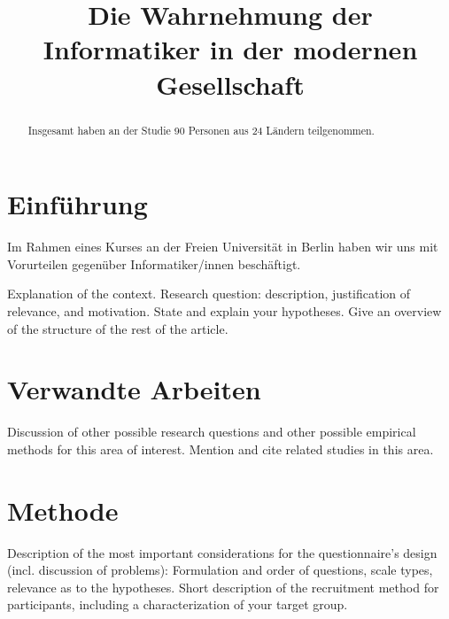 \documentclass[de]{agse-empir-report}\usepackage[]{graphicx}\usepackage[]{color}
\begin{document}
\title{Die Wahrnehmung der Informatiker in der modernen Gesellschaft}
\author{
    \and
    \and
}

\maketitle



\begin{abstract}
    \lipsum[1]
    Insgesamt haben an der Studie 90 Personen
    aus 24 Ländern teilgenommen.
\end{abstract}


\section[fz]{Einführung}

Im Rahmen eines Kurses an der Freien Universität in Berlin haben wir uns mit Vorurteilen gegenüber Informatiker/innen beschäftigt.


Explanation of the context.
Research question: description, justification of relevance,
and motivation.
State and explain your hypotheses.
Give an overview of the structure of the rest of the article.

\lipsum[2]


\section[kk]{Verwandte Arbeiten}

Discussion of other possible research questions and other possible
empirical methods for this area of interest.
Mention and cite related studies in this area.

\lipsum[3]


\section[jk]{Methode}

Description of the most important considerations for the
questionnaire's design (incl. discussion of problems):
Formulation and order of questions, scale types, relevance as to the
hypotheses.
Short description of the recruitment method for participants,
including a characterization of your target group.

\lipsum[4]
\end{document}
